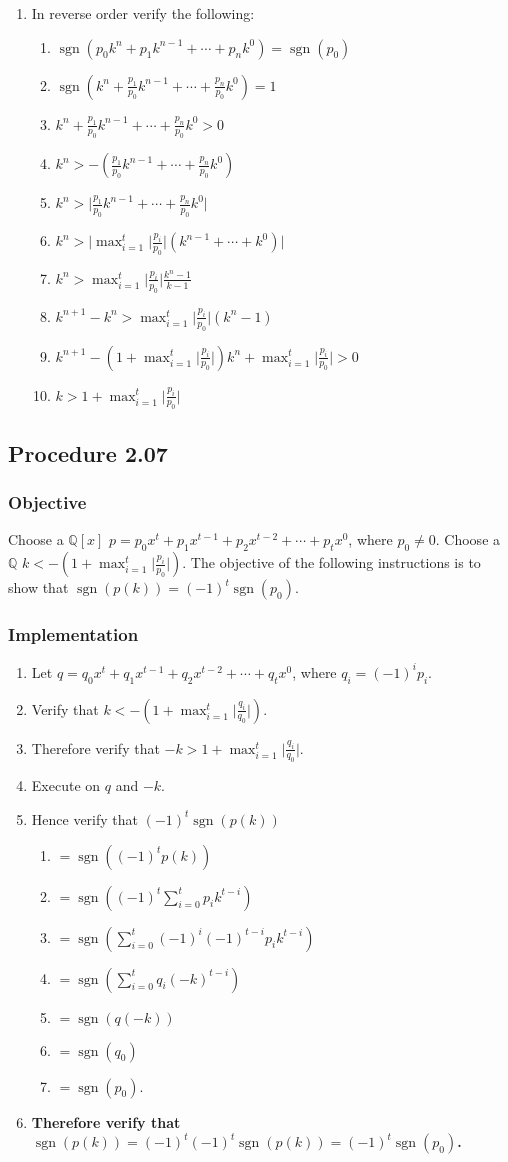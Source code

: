 \documentclass[twocolumn]{article}
\DeclareMathOperator{\sgn}{sgn}
\newcommand{\procedure}[2][]{\subsection*{Procedure #2 \ifthenelse{\equal{#1}{}}{}{(#1)}}\label{sec:procedure #2}}
\newcommand{\objective}{\subsubsection*{Objective}}
\newcommand{\implementation}{\subsubsection*{Implementation}}
\newcommand{\procedurehr}[2][]{\hyperref[sec:procedure #2]{\ifthenelse{\equal{#1}{}}{procedure #2}{#1}}}
\begin{document}
				\begin{enumerate}
					\item In reverse order verify the following:
					\begin{enumerate}
						\item \textbf{$\sgn(p_0k^n+p_1k^{n-1}+\cdots+p_nk^0)=\sgn(p_0)$}
						\item $\sgn(k^n+\frac{p_1}{p_0}k^{n-1}+\cdots+\frac{p_n}{p_0}k^0)=1$
						\item $k^n+\frac{p_1}{p_0}k^{n-1}+\cdots+\frac{p_n}{p_0}k^0>0$
						\item $k^n>-(\frac{p_1}{p_0}k^{n-1}+\cdots+\frac{p_n}{p_0}k^0)$
						\item $k^n>\lvert \frac{p_1}{p_0}k^{n-1}+\cdots+\frac{p_n}{p_0}k^0\rvert$
						\item $k^n>\lvert\max_{i=1}^t\lvert \frac{p_i}{p_0}\rvert(k^{n-1}+\cdots+k^0)\rvert$
						\item $k^n>\max_{i=1}^t\lvert \frac{p_i}{p_0}\rvert\frac{k^n-1}{k-1}$
						\item $k^{n+1}-k^n>\max_{i=1}^t\lvert \frac{p_i}{p_0}\rvert(k^n-1)$
						\item $k^{n+1}-(1+\max_{i=1}^t\lvert \frac{p_i}{p_0}\rvert)k^n+\max_{i=1}^t\lvert \frac{p_i}{p_0}\rvert>0$
						\item $k>1+\max_{i=1}^t\lvert \frac{p_i}{p_0}\rvert$
					\end{enumerate}
				\end{enumerate}
		\procedure{2.07}
			\objective
				Choose a $\mathbb{Q}[x]$ $p=p_0x^t+p_1x^{t-1}+p_2x^{t-2}+\cdots+p_tx^0$, where $p_0\ne 0$. Choose a $\mathbb{Q}$ $k<-(1+\max_{i=1}^t\lvert\frac{p_i}{p_0}\rvert)$. The objective of the following instructions is to show that $\sgn(p(k))=(-1)^t\sgn(p_0)$.
			\implementation
				\begin{enumerate}
					\item Let $q=q_0x^t+q_1x^{t-1}+q_2x^{t-2}+\cdots+q_tx^0$, where $q_i=(-1)^ip_i$.
					\item Verify that $k<-(1+\max_{i=1}^t\lvert\frac{q_i}{q_0}\rvert)$.
					\item Therefore verify that $-k>1+\max_{i=1}^t\lvert\frac{q_i}{q_0}\rvert$.
					\item Execute \procedurehr{2.06} on $q$ and $-k$.
					\item Hence verify that $(-1)^t\sgn(p(k))$
					\begin{enumerate}
						\item $=\sgn((-1)^tp(k))$
						\item $=\sgn((-1)^t\sum_{i=0}^t p_ik^{t-i})$
						\item $=\sgn(\sum_{i=0}^t (-1)^i(-1)^{t-i}p_ik^{t-i})$
						\item $=\sgn(\sum_{i=0}^t q_i(-k)^{t-i})$
						\item $=\sgn(q(-k))$
						\item $=\sgn(q_0)$
						\item $=\sgn(p_0)$.
					\end{enumerate}
					\item \textbf{Therefore verify that $\sgn(p(k))=(-1)^t(-1)^t\sgn(p(k))=(-1)^t\sgn(p_0)$.}
				\end{enumerate}
\end{document}
